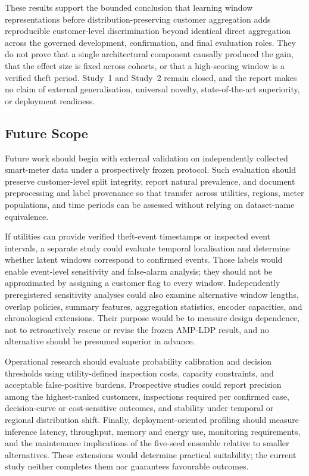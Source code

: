 These results support the bounded conclusion that learning window representations before distribution-preserving customer aggregation adds reproducible customer-level discrimination beyond identical direct aggregation across the governed development, confirmation, and final evaluation roles. They do not prove that a single architectural component causally produced the gain, that the effect size is fixed across cohorts, or that a high-scoring window is a verified theft period. Study~1 and Study~2 remain closed, and the report makes no claim of external generalisation, universal novelty, state-of-the-art superiority, or deployment readiness.

\subsection{Future Scope}

Future work should begin with external validation on independently collected smart-meter data under a prospectively frozen protocol. Such evaluation should preserve customer-level split integrity, report natural prevalence, and document preprocessing and label provenance so that transfer across utilities, regions, meter populations, and time periods can be assessed without relying on dataset-name equivalence.

If utilities can provide verified theft-event timestamps or inspected event intervals, a separate study could evaluate temporal localisation and determine whether latent windows correspond to confirmed events. Those labels would enable event-level sensitivity and false-alarm analysis; they should not be approximated by assigning a customer flag to every window. Independently preregistered sensitivity analyses could also examine alternative window lengths, overlap policies, summary features, aggregation statistics, encoder capacities, and chronological extensions. Their purpose would be to measure design dependence, not to retroactively rescue or revise the frozen AMP-LDP result, and no alternative should be presumed superior in advance.

Operational research should evaluate probability calibration and decision thresholds using utility-defined inspection costs, capacity constraints, and acceptable false-positive burdens. Prospective studies could report precision among the highest-ranked customers, inspections required per confirmed case, decision-curve or cost-sensitive outcomes, and stability under temporal or regional distribution shift. Finally, deployment-oriented profiling should measure inference latency, throughput, memory and energy use, monitoring requirements, and the maintenance implications of the five-seed ensemble relative to smaller alternatives. These extensions would determine practical suitability; the current study neither completes them nor guarantees favourable outcomes.
